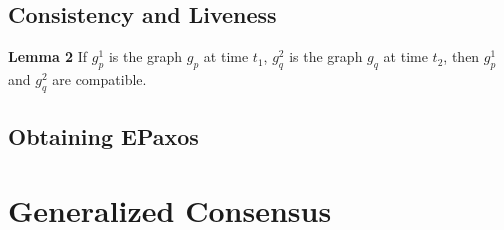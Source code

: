 \begin{comment}
Define $\opn{Lin}_g\left( \leq \right) = f\left[ V_1 \right] \cdot F\left[ V_2 \right] \cdot F\left[ V_n \right]$, where $V_i\in V\left( \hat{g} \right)$ 


Define the set of linearizations $\opn{Lins}\left( g \right)$ of a graph $g$ as the set of sequences whose length is the cardinality of $V\left( g \right)$, which contain each element of $V\left( g \right)$ exactly once, and ... \todo{or first define the partial order induced by a graph and then its compatible total orders.}

Consider a function $f$ mapping sets of commands to sequences of commands such that $f\left[ \mathcal{C} \right]$ contains each command in $\mathcal{C}$ exactly once.
A sequence of commands $cseq$ is an $f$-linearization of the graph $g$ if and only there is a sequence whose element of strongly connected 

\todo{Explain the graph processing algo independently? Its key property is that when $G1 \subseteq G2$ then $lin\left( c_1,G1 \right)$ is a prefix of $lin\left( c_2,G2 \right)$ or vice-versa.}

\end{comment}

\subsection{Consistency and Liveness}

\textbf{Lemma 2}
If $g_p^1$ is the graph $g_p$ at time $t_1$, $g_q^2$ is the graph $g_q$ at time $t_2$, then $g_p^1$ and $g_q^2$ are compatible.

\begin{comment}
\textbf{Lemma 3}
Consider $g_1$ and $g_2$. Assume that if $v\in V\left( g_1 \right)$ and $v\in V\left( g_2 \right)$ then $n\left( g_1 \right)=n\left( g2 \right)$.

\textbf{Lemma 4}
If $m_p\subseteq m_q$

\end{comment}

\subsection{Obtaining EPaxos}

\printbibliography%

\appendix

\section{Generalized Consensus}


